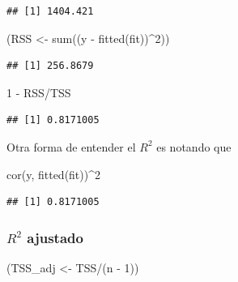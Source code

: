 \documentclass[
  12pt,
]{book}
\newenvironment{Shaded}{\begin{snugshade}}{\end{snugshade}}
\newcommand{\DecValTok}[1]{\textcolor[rgb]{0.00,0.00,0.81}{#1}}
\newcommand{\FunctionTok}[1]{\textcolor[rgb]{0.00,0.00,0.00}{#1}}
\newcommand{\NormalTok}[1]{#1}
\newcommand{\OtherTok}[1]{\textcolor[rgb]{0.56,0.35,0.01}{#1}}
\newcommand{\SpecialCharTok}[1]{\textcolor[rgb]{0.00,0.00,0.00}{#1}}
\theoremstyle{definition}
\theoremstyle{definition}
\theoremstyle{definition}
\theoremstyle{definition}
\theoremstyle{remark}
\begin{document}
\begin{verbatim}
## [1] 1404.421
\end{verbatim}

\begin{Shaded}
\begin{Highlighting}[]
\NormalTok{(RSS }\OtherTok{\textless{}{-}} \FunctionTok{sum}\NormalTok{((y }\SpecialCharTok{{-}} \FunctionTok{fitted}\NormalTok{(fit))}\SpecialCharTok{\^{}}\DecValTok{2}\NormalTok{))}
\end{Highlighting}
\end{Shaded}

\begin{verbatim}
## [1] 256.8679
\end{verbatim}

\begin{Shaded}
\begin{Highlighting}[]
\DecValTok{1} \SpecialCharTok{{-}}\NormalTok{ RSS}\SpecialCharTok{/}\NormalTok{TSS}
\end{Highlighting}
\end{Shaded}

\begin{verbatim}
## [1] 0.8171005
\end{verbatim}

Otra forma de entender el \(R^2\) es notando que

\begin{Shaded}
\begin{Highlighting}[]
\FunctionTok{cor}\NormalTok{(y, }\FunctionTok{fitted}\NormalTok{(fit))}\SpecialCharTok{\^{}}\DecValTok{2}
\end{Highlighting}
\end{Shaded}

\begin{verbatim}
## [1] 0.8171005
\end{verbatim}

\hypertarget{r2-ajustado}{%
\subsubsection{\texorpdfstring{\(R^2\) ajustado}{R\^{}2 ajustado}}\label{r2-ajustado}}

\begin{Shaded}
\begin{Highlighting}[]
\NormalTok{(TSS\_adj }\OtherTok{\textless{}{-}}\NormalTok{ TSS}\SpecialCharTok{/}\NormalTok{(n }\SpecialCharTok{{-}} \DecValTok{1}\NormalTok{))}
\end{Highlighting}
\end{Shaded}
\end{document}
